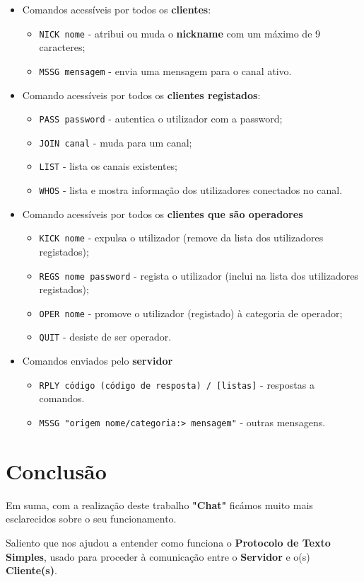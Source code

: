 \documentclass[11pt]{article}   %
\begin{document}
\begin{itemize}
    \item Comandos acessíveis por todos os \textbf{clientes}:
    \begin{itemize}
        \item \verb|NICK nome| - atribui ou muda o \textbf{nickname} com um máximo de 9 caracteres;
        \item \verb|MSSG mensagem| - envia uma mensagem para o canal ativo.
    \end{itemize}
    \item Comando acessíveis por todos os \textbf{clientes registados}:
        \begin{itemize}
            \item \verb|PASS password| - autentica o utilizador com a password;
            \item \verb|JOIN canal| - muda para um canal;
            \item \verb|LIST| - lista os canais existentes;
            \item \verb|WHOS| - lista e mostra informação dos utilizadores conectados no canal.
        \end{itemize}
    \item Comando acessíveis por todos os \textbf{clientes que são operadores}
        \begin{itemize}
            \item \verb|KICK nome| - expulsa o utilizador (remove da lista dos utilizadores registados);
            \item \verb|REGS nome password| - regista o utilizador (inclui na lista dos utilizadores registados);
            \item \verb|OPER nome| - promove o utilizador (registado) à categoria de operador;
            \item \verb|QUIT| - desiste de ser operador.
        \end{itemize}
    \item Comandos enviados pelo \textbf{servidor}
        \begin{itemize}
            \item \verb|RPLY código (código de resposta) / [listas]| - respostas a comandos.
            \item \verb|MSSG "origem nome/categoria:> mensagem"| - outras mensagens.
        \end{itemize}
\end{itemize}

\section{Conclusão} %
\hspace{0,5cm}Em suma, com a realização deste trabalho \textbf{"Chat"} ficámos muito 
mais esclarecidos sobre o seu funcionamento. \par
Saliento que nos ajudou a entender como funciona o \textbf{Protocolo de Texto Simples}, 
usado para proceder à comunicação entre o \textbf{Servidor} e o(s) \textbf{Cliente(s)}. 

\end{document}
